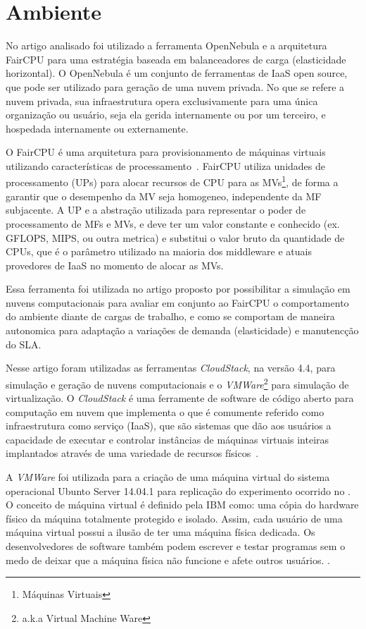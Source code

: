 \section{Ambiente}

No artigo analisado foi utilizado a ferramenta OpenNebula e a arquitetura FairCPU para uma estratégia baseada em balanceadores de carga (elasticidade horizontal). O OpenNebula é um conjunto de ferramentas de IaaS open source, que pode ser utilizado para geração de uma nuvem privada. No que se refere a nuvem privada, sua infraestrutura opera exclusivamente para uma única organização ou usuário, seja ela gerida internamente ou por um terceiro, e hospedada internamente ou externamente.

O FairCPU é uma arquitetura para provisionamento de máquinas virtuais utilizando
características de processamento~\cite{faircpu:12}. FairCPU utiliza unidades de processamento (UPs) para alocar recursos de CPU para as MVs\footnote{Máquinas Virtuais}, de forma a garantir que o desempenho da MV seja homogeneo, independente da MF subjacente. A UP e a abstração utilizada para representar o poder de processamento de MFs e MVs, e deve ter um valor constante e conhecido (ex. GFLOPS, MIPS, ou outra metrica) e substitui o valor bruto da quantidade de CPUs, que é o parâmetro utilizado na maioria dos middleware e atuais provedores de IaaS no momento de alocar as MVs.

Essa ferramenta foi utilizada no artigo \cite{coutinho_et_al:14} proposto por possibilitar a simulação em nuvens computacionais para avaliar em conjunto ao FairCPU o comportamento do ambiente diante de cargas de trabalho, e como se comportam de maneira autonomica para adaptação a variações de demanda (elasticidade) e manutencção do SLA.

Nesse artigo foram utilizadas as ferramentas \textit{CloudStack}, na versão 4.4, para simulação e geração de nuvens computacionais e o \textit{VMWare}\footnote{a.k.a Virtual Machine Ware} para simulação de virtualização. O \textit{CloudStack}
é uma ferramente de software de código aberto para computação em nuvem que implementa o que é comumente referido como infraestrutura como serviço (IaaS), que são sistemas que dão aos usuários a capacidade de executar e controlar instâncias de máquinas virtuais inteiras implantados através de uma variedade de recursos físicos~\cite{nurmi_2009}. 

A \textit{VMWare} foi utilizada para a criação de uma máquina virtual do sistema operacional Ubunto Server 14.04.1 para replicação do experimento ocorrido no \cite{elaine_et_al:14}. O conceito de máquina virtual é definido pela IBM como: uma cópia do hardware físico da máquina totalmente protegido e isolado. Assim, cada usuário de uma máquina virtual possui a ilusão de ter uma máquina física dedicada. Os desenvolvedores de software também podem escrever e testar programas sem o medo de deixar que a máquina física
não funcione e afete outros usuários. \cite{sugerman2001virtualizing}.
